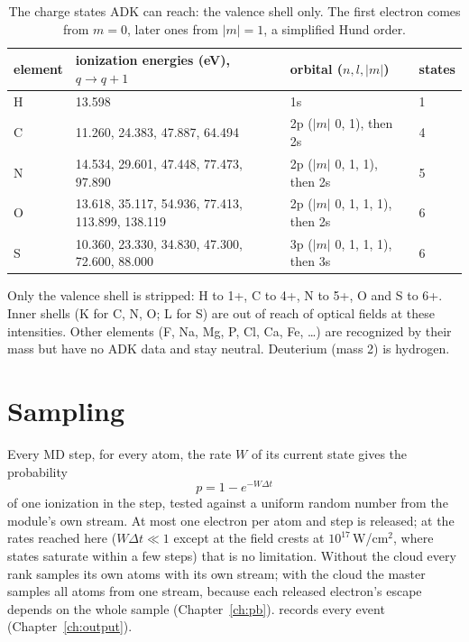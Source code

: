 \begin{table}[H]
\centering\small
\begin{tabular}{@{}l l l l@{}}
\toprule
element & ionization energies (eV), $q\to q+1$ & orbital ($n,l,|m|$) & states \\
\midrule
H & 13.598 & 1s & 1 \\
C & 11.260, 24.383, 47.887, 64.494 & 2p ($|m|$ 0, 1), then 2s & 4 \\
N & 14.534, 29.601, 47.448, 77.473, 97.890 & 2p ($|m|$ 0, 1, 1), then 2s & 5 \\
O & 13.618, 35.117, 54.936, 77.413, 113.899, 138.119 & 2p ($|m|$ 0, 1, 1, 1), then 2s & 6 \\
S & 10.360, 23.330, 34.830, 47.300, 72.600, 88.000 & 3p ($|m|$ 0, 1, 1, 1), then 3s & 6 \\
\bottomrule
\end{tabular}
\caption{The charge states ADK can reach: the valence shell only. The first electron comes from $m=0$, later ones from
$|m|=1$, a simplified Hund order.}
\label{tab:adk}
\end{table}

Only the valence shell is stripped: H to 1+, C to 4+, N to 5+, O and S to 6+.
Inner shells (K for C, N, O; L for S) are out of reach of optical fields at these intensities.
Other elements (F, Na, Mg, P, Cl, Ca, Fe, \dots) are recognized by their mass but have no ADK data and stay neutral.
Deuterium (mass 2) is hydrogen.

\section{Sampling}

Every MD step, for every atom, the rate $W$ of its current state gives the probability
\begin{equation}
  p = 1 - e^{-W\Delta t}
\end{equation}
of one ionization in the step, tested against a uniform random number from the module's own stream.
At most one electron per atom and step is released; at the rates reached here ($W\Delta t\ll1$ except at the field
crests at $10^{17}$\,W/cm$^2$, where states saturate within a few steps) that is no limitation.
Without the cloud every rank samples its own atoms with its own stream; with the cloud the master samples all atoms
from one stream, because each released electron's escape depends on the whole sample (Chapter~\ref{ch:pb}).
 records every event (Chapter~\ref{ch:output}).

